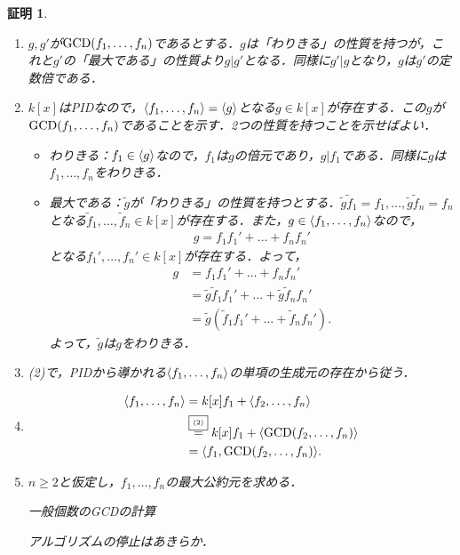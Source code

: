 \documentclass[9pt]{ltjsarticle}
\theoremstyle{break}
\theoremstyle{break}
\theoremstyle{break}
\theoremstyle{break}
\theoremstyle{break}
\theoremstyle{break}
\theoremstyle{break}
\theoremstyle{break}
\theoremstyle{break}
\theoremstyle{break}
\theoremstyle{break}
\theoremstyle{break}
\theoremstyle{break}
\theoremstyle{break}
\theoremstyle{break}
\theoremstyle{nonumberbreak}
\newtheorem{myproof}{証明}
\theoremstyle{nonumberbreak}
\begin{document}
\begin{myproof}
 \begin{enumerate}[label=(\arabic*)]
  \item $g,g'$が${\rm GCD}(f_1,\dots,f_n)$であるとする．$g$は「わりきる」の性質を持つが，これと$g'$の「最大である」の性質より$g| g'$となる．同様に$g' | g$となり，$g$は$g'$の定数倍である．
  \item $k[x]$はPIDなので，$\langle f_1,\dots,f_n \rangle=\langle g \rangle$となる$g\in k[x]$が存在する．この$g$が${\rm GCD}(f_1,\dots,f_n)$であることを示す．2つの性質を持つことを示せばよい．
\begin{itemize}
 \item わりきる：$f_1 \in \langle g \rangle$なので，$f_1$は$g$の倍元であり，$g|f_1$である．同様に$g$は$f_1,\dots,f_n$をわりきる．
 \item 最大である：$\tilde g$が「わりきる」の性質を持つとする．$\tilde g \tilde f_1= f_1 ,\dots, \tilde g \tilde f_n= f_n $となる$\tilde f_1,\dots,\tilde f_n \in k[x]$が存在する．また，$g\in \langle f_1,\dots,f_n \rangle$なので，
\begin{align}
 g = f_1 f_1' + \dots + f_n f_n'
\end{align}
となる$f_1',\dots,f_n' \in k[x]$が存在する．よって，
\begin{align}
 g &= f_1 f_1' + \dots + f_n f_n'\\
 & =
\tilde g \tilde f_1 f_1' + \dots + \tilde g \tilde f_n f_n'\\
 & =
\tilde g(\tilde f_1 f_1' + \dots + \tilde f_n f_n').
\end{align}
よって，$\tilde g$は$g$をわりきる．
\end{itemize}
  \item (2)で，PIDから導かれる$\langle f_1,\dots,f_n \rangle$の単項の生成元の存在から従う．
  \item
\begin{align}
 \langle f_1,\dots,f_n \rangle &=
k[x]f_1 + \langle f_2,\dots,f_n \rangle\\
 & \overset{\text{\fbox{\tiny (2)}}}{=}
k[x]f_1 + \langle {\rm GCD}(f_2,\dots,f_n) \rangle\\
 & =
\langle f_1, {\rm GCD}(f_2,\dots,f_n) \rangle.
\end{align}
  \item
$n\ge 2$と仮定し，$f_1,\dots,f_n$の最大公約元を求める．
\begin{algorithm}[H]
\caption{一般個数のGCDの計算}
 \begin{algorithmic}[1]
  \ENDWHILE{}
 \end{algorithmic}
\end{algorithm}
アルゴリズムの停止はあきらか．


\end{enumerate}
\end{myproof}
\end{document}

